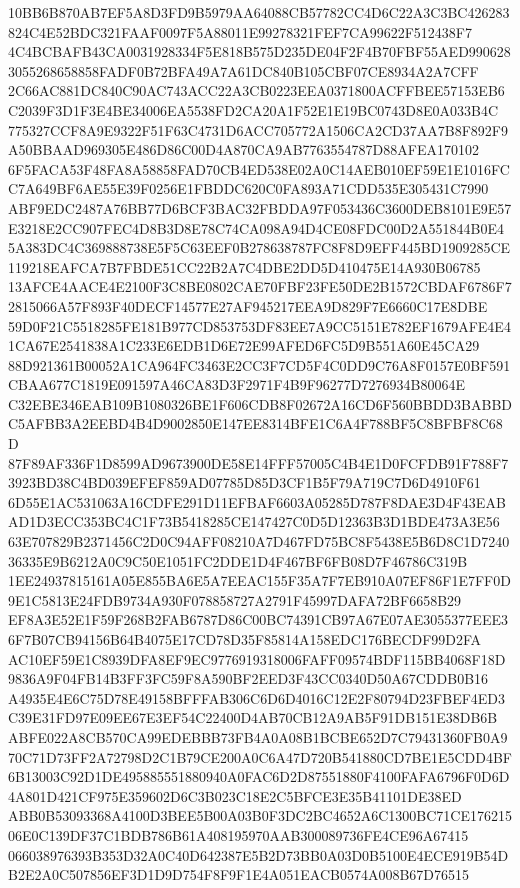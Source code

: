 \documentclass[UTF8,fontset=fandol,zihao=-4,a4paper]{ctexart}
\begin{document}
{{10BB6B870AB7EF5A8D3FD9B5979AA64088CB57782CC4D6C22A3C3BC426283824C4E52BDC321FAAF0097F5A88011E99278321FEF7CA99622F512438F7
4C4BCBAFB43CA0031928334F5E818B575D235DE04F2F4B70FBF55AED9906283055268658858FADF0B72BFA49A7A61DC840B105CBF07CE8934A2A7CFF
2C66AC881DC840C90AC743ACC22A3CB0223EEA0371800ACFFBEE57153EB6C2039F3D1F3E4BE34006EA5538FD2CA20A1F52E1E19BC0743D8E0A033B4C
775327CCF8A9E9322F51F63C4731D6ACC705772A1506CA2CD37AA7B8F892F9A50BBAAD969305E486D86C00D4A870CA9AB7763554787D88AFEA170102
6F5FACA53F48FA8A58858FAD70CB4ED538E02A0C14AEB010EF59E1E1016FCC7A649BF6AE55E39F0256E1FBDDC620C0FA893A71CDD535E305431C7990
ABF9EDC2487A76BB77D6BCF3BAC32FBDDA97F053436C3600DEB8101E9E57E3218E2CC907FEC4D8B3D8E78C74CA098A94D4CE08FDC00D2A551844B0E4
5A383DC4C369888738E5F5C63EEF0B278638787FC8F8D9EFF445BD1909285CE119218EAFCA7B7FBDE51CC22B2A7C4DBE2DD5D410475E14A930B06785
13AFCE4AACE4E2100F3C8BE0802CAE70FBF23FE50DE2B1572CBDAF6786F72815066A57F893F40DECF14577E27AF945217EEA9D829F7E6660C17E8DBE
59D0F21C5518285FE181B977CD853753DF83EE7A9CC5151E782EF1679AFE4E41CA67E2541838A1C233E6EDB1D6E72E99AFED6FC5D9B551A60E45CA29
88D921361B00052A1CA964FC3463E2CC3F7CD5F4C0DD9C76A8F0157E0BF591CBAA677C1819E091597A46CA83D3F2971F4B9F96277D7276934B80064E
C32EBE346EAB109B1080326BE1F606CDB8F02672A16CD6F560BBDD3BABBDC5AFBB3A2EEBD4B4D9002850E147EE8314BFE1C6A4F788BF5C8BFBF8C68D
87F89AF336F1D8599AD9673900DE58E14FFF57005C4B4E1D0FCFDB91F788F73923BD38C4BD039EFEF859AD07785D85D3CF1B5F79A719C7D6D4910F61
6D55E1AC531063A16CDFE291D11EFBAF6603A05285D787F8DAE3D4F43EABAD1D3ECC353BC4C1F73B5418285CE147427C0D5D12363B3D1BDE473A3E56
63E707829B2371456C2D0C94AFF08210A7D467FD75BC8F5438E5B6D8C1D724036335E9B6212A0C9C50E1051FC2DDE1D4F467BF6FB08D7F46786C319B
1EE24937815161A05E855BA6E5A7EEAC155F35A7F7EB910A07EF86F1E7FF0D9E1C5813E24FDB9734A930F078858727A2791F45997DAFA72BF6658B29
EF8A3E52E1F59F268B2FAB6787D86C00BC74391CB97A67E07AE3055377EEE36F7B07CB94156B64B4075E17CD78D35F85814A158EDC176BECDF99D2FA
AC10EF59E1C8939DFA8EF9EC9776919318006FAFF09574BDF115BB4068F18D9836A9F04FB14B3FF3FC59F8A590BF2EED3F43CC0340D50A67CDDB0B16
A4935E4E6C75D78E49158BFFFAB306C6D6D4016C12E2F80794D23FBEF4ED3C39E31FD97E09EE67E3EF54C22400D4AB70CB12A9AB5F91DB151E38DB6B
ABFE022A8CB570CA99EDEBBB73FB4A0A08B1BCBE652D7C79431360FB0A970C71D73FF2A72798D2C1B79CE200A0C6A47D720B541880CD7BE1E5CDD4BF
6B13003C92D1DE495885551880940A0FAC6D2D87551880F4100FAFA6796F0D6D4A801D421CF975E359602D6C3B023C18E2C5BFCE3E35B41101DE38ED
ABB0B53093368A4100D3BEE5B00A03B0F3DC2BC4652A6C1300BC71CE17621506E0C139DF37C1BDB786B61A408195970AAB300089736FE4CE96A67415
066038976393B353D32A0C40D642387E5B2D73BB0A03D0B5100E4ECE919B54DB2E2A0C507856EF3D1D9D754F8F9F1E4A051EACB0574A008B67D76515
}}
\end{document}
